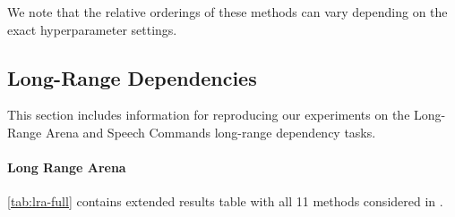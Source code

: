 We note that the relative orderings of these methods can vary depending on the exact hyperparameter settings.

\subsection{Long-Range Dependencies}
\label{sec:experiment-details-lrd}
This section includes information for reproducing our experiments on the Long-Range Arena and Speech Commands long-range dependency tasks.

\paragraph{Long Range Arena}

\cref{tab:lra-full} contains extended results table with all 11 methods considered in \citep{tay2021long}.


